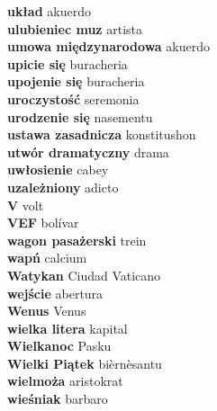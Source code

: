 \textbf{ układ  } akuerdo \\
\textbf{ ulubieniec muz  } artista \\
\textbf{ umowa międzynarodowa  } akuerdo \\
\textbf{ upicie się  } buracheria \\
\textbf{ upojenie się  } buracheria \\
\textbf{ uroczystość  } seremonia \\
\textbf{ urodzenie się  } nasementu \\
\textbf{ ustawa zasadnicza  } konstitushon \\
\textbf{ utwór dramatyczny  } drama \\
\textbf{ uwłosienie  } cabey \\
\textbf{ uzależniony  } adicto \\
\textbf{ V  } volt \\
\textbf{ VEF  } bolívar \\
\textbf{ wagon pasażerski  } trein \\
\textbf{ wapń  } calcium \\
\textbf{ Watykan  } Ciudad Vaticano \\
\textbf{ wejście  } abertura \\
\textbf{ Wenus  } Venus \\
\textbf{ wielka litera  } kapital \\
\textbf{ Wielkanoc  } Pasku \\
\textbf{ Wielki Piątek  } bièrnèsantu \\
\textbf{ wielmoża  } aristokrat \\
\textbf{ wieśniak  } barbaro \\
